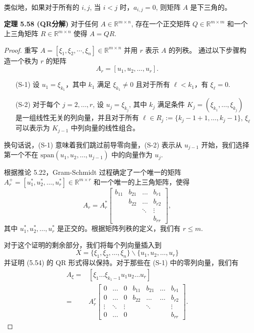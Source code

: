 \documentclass[a4paper]{ctexart}
\begin{document}
{类似地，如果对于所有的 $i, j$, 当 $i < j$ 时，$a_{i, j} = 0$, 则矩阵 $A$ 是下三角的。

\noindent \textbf{定理 5.58 (QR分解) } 对于任何 $A \in \mathbb{R}^{m \times n}$, 
存在一个正交矩阵 $Q \in \mathbb{R}^{m \times m}$ 和一个上三角矩阵 $R \in \mathbb{R}^{m \times n}$ 使得 $A = QR$.

\begin{proof}
重写 $A = [\xi_1, \xi_2, \cdots, \xi_n] \in \mathbb{R}^{m \times n}$ 并用 $r$ 表示 $A$ 的列秩。
通过以下步骤构造一个秩为 $r$ 的矩阵
\[ 
  A_r = [u_1, u_2, \ldots, u_r]. 
\]
\begin{itemize}
  \item[(S-1)] 设 $u_1 = \xi_{k_1}$，其中 $k_1$ 满足 $\xi_{k_1} \neq 0$ 且对于所有 $\ell < k_1$，有 $\xi_\ell = 0$.
  \item[(S-2)] 对于每个 $j = 2, \ldots, r$, 设 $u_j = \xi_{k_j}$, 其中 $k_j$ 满足条件 $K_j = (\xi_{k_1}, \ldots, \xi_{k_j})$ 
  是一组线性无关的列向量，并且对于所有 $\ell \in R_j := \{k_j - 1 + 1, \ldots, k_j - 1\}$, $\xi_\ell$ 可以表示为 $K_{j - 1}$ 中列向量的线性组合。
\end{itemize}  
  
换句话说，(S-1) 意味着我们跳过前导零向量，(S-2) 表示从 $u_{j-1}$ 开始，我们选择第一个不在 $\text{span}(u_1, u_2, \ldots, u_{j-1})$ 中的向量作为 $u_j$.
  
根据推论 5.22，Gram-Schmidt 过程确定了一个唯一的矩阵 $A_r^+ = [u_1^*, u_2^*, \ldots, u_r^*] \in \mathbb{R}^{m \times r}$ 和一个唯一的上三角矩阵，使得
\[ 
  A_r = A_r^* 
    \begin{bmatrix} b_{11} & b_{21} & \ldots & b_{r1} \\ 
      & b_{22} & \ldots & b_{r2} \\ 
      & & \ddots & \vdots \\ 
      & & & b_{rr} 
    \end{bmatrix}, 
\]
其中 $u_1^*, u_2^*, \ldots, u_r^*$ 是正交的。根据矩阵列秩的定义，我们有 $r \leq m$.
  
对于这个证明的剩余部分，我们将每个列向量插入到
\[ 
  X = \{\xi_1, \xi_2, \ldots, \xi_n\} \backslash \{u_1, u_2, \ldots, u_r\} 
\]
并证明 (5.54) 的 QR 形式得以保持。对于那些在 (S-1) 中的零列向量，我们有
\begin{align*} A_{\xi} = &{\left[\xi_1 \ldots \xi_{k_1-1} u_1 u_2 \ldots u_r\right]} \\
     = &A_r^r \begin{bmatrix} 0 & \ldots & 0 & b_{11} & b_{21} & \ldots & b_{r1} \\
       0 & \ldots & 0 & b_{22}  &\ldots & \ldots & b_{r2} \\ 
       \vdots & \ddots & \vdots & & \ddots && \vdots \\ 
       0 & \ldots & 0 & & && b_{rr} \end{bmatrix}. 
\end{align*}
  

\end{proof}}
\end{document}
